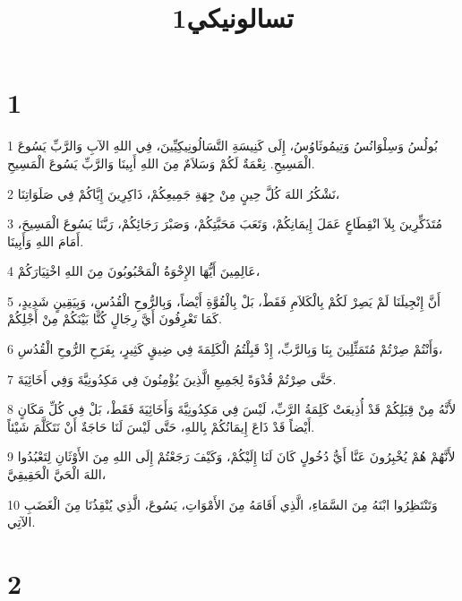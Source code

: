 

\title{1تسالونيكي}


\chapter{1}

\par 1 بُولُسُ وَسِلْوَانُسُ وَتِيمُوثَاوُسُ، إِلَى كَنِيسَةِ التَّسَالُونِيكِيِّينَ، فِي اللهِ الآبِ وَالرَّبِّ يَسُوعَ الْمَسِيحِ. نِعْمَةٌ لَكُمْ وَسَلاَمٌ مِنَ اللهِ أَبِينَا وَالرَّبِّ يَسُوعَ الْمَسِيحِ.
\par 2 نَشْكُرُ اللهَ كُلَّ حِينٍ مِنْ جِهَةِ جَمِيعِكُمْ، ذَاكِرِينَ إِيَّاكُمْ فِي صَلَوَاتِنَا،
\par 3 مُتَذَكِّرِينَ بِلاَ انْقِطَاعٍ عَمَلَ إِيمَانِكُمْ، وَتَعَبَ مَحَبَّتِكُمْ، وَصَبْرَ رَجَائِكُمْ، رَبَّنَا يَسُوعَ الْمَسِيحَ، أَمَامَ اللهِ وَأَبِينَا.
\par 4 عَالِمِينَ أَيُّهَا الإِخْوَةُ الْمَحْبُوبُونَ مِنَ اللهِ اخْتِيَارَكُمْ،
\par 5 أَنَّ إِنْجِيلَنَا لَمْ يَصِرْ لَكُمْ بِالْكَلاَمِ فَقَطْ، بَلْ بِالْقُوَّةِ أَيْضاً، وَبِالرُّوحِ الْقُدُسِ، وَبِيَقِينٍ شَدِيدٍ، كَمَا تَعْرِفُونَ أَيَّ رِجَالٍ كُنَّا بَيْنَكُمْ مِنْ أَجْلِكُمْ.
\par 6 وَأَنْتُمْ صِرْتُمْ مُتَمَثِّلِينَ بِنَا وَبِالرَّبِّ، إِذْ قَبِلْتُمُ الْكَلِمَةَ فِي ضِيقٍ كَثِيرٍ، بِفَرَحِ الرُّوحِ الْقُدُسِ،
\par 7 حَتَّى صِرْتُمْ قُدْوَةً لِجَمِيعِ الَّذِينَ يُؤْمِنُونَ فِي مَكِدُونِيَّةَ وَفِي أَخَائِيَةَ.
\par 8 لأَنَّهُ مِنْ قِبَلِكُمْ قَدْ أُذِيعَتْ كَلِمَةُ الرَّبِّ، لَيْسَ فِي مَكِدُونِيَّةَ وَأَخَائِيَةَ فَقَطْ، بَلْ فِي كُلِّ مَكَانٍ أَيْضاً قَدْ ذَاعَ إِيمَانُكُمْ بِاللهِ، حَتَّى لَيْسَ لَنَا حَاجَةٌ أَنْ نَتَكَلَّمَ شَيْئاً.
\par 9 لأَنَّهُمْ هُمْ يُخْبِرُونَ عَنَّا أَيُّ دُخُولٍ كَانَ لَنَا إِلَيْكُمْ، وَكَيْفَ رَجَعْتُمْ إِلَى اللهِ مِنَ الأَوْثَانِ لِتَعْبُدُوا اللهَ الْحَيَّ الْحَقِيقِيَّ،
\par 10 وَتَنْتَظِرُوا ابْنَهُ مِنَ السَّمَاءِ، الَّذِي أَقَامَهُ مِنَ الأَمْوَاتِ، يَسُوعَ، الَّذِي يُنْقِذُنَا مِنَ الْغَضَبِ الآتِي.

\chapter{2}


